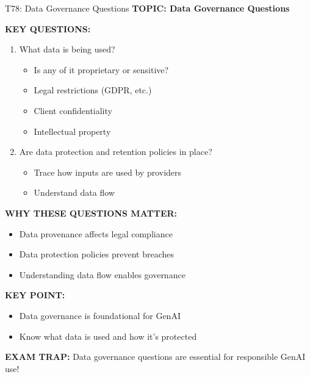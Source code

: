 \documentclass[8pt]{beamer}
\begin{document}
	\begin{frame}{T78: Data Governance Questions}
		\fontsize{6.5}{7.5}\selectfont
		\textbf{TOPIC: Data Governance Questions}
		
		\vspace{0.1cm}
		\textbf{KEY QUESTIONS:}
		\begin{enumerate}
			\item \textcolor{myblue}{What data is being used?}
			\begin{itemize}
				\item Is any of it proprietary or sensitive?
				\item Legal restrictions (GDPR, etc.)
				\item Client confidentiality
				\item Intellectual property
			\end{itemize}
			\item \textcolor{myblue}{Are data protection and retention policies in place?}
			\begin{itemize}
				\item Trace how inputs are used by providers
				\item Understand data flow
			\end{itemize}
		\end{enumerate}
		
		\vspace{0.1cm}
		\textbf{WHY THESE QUESTIONS MATTER:}
		\begin{itemize}
			\item Data provenance affects legal compliance
			\item Data protection policies prevent breaches
			\item Understanding data flow enables governance
		\end{itemize}
		
		\vspace{0.1cm}
		\textbf{KEY POINT:}
		\begin{itemize}
			\item Data governance is foundational for GenAI
			\item Know what data is used and how it's protected
		\end{itemize}
		
		\textcolor{myred}{\textbf{EXAM TRAP:}} Data governance questions are \textcolor{myblue}{essential for responsible GenAI use}!
	\end{frame}
	
\end{document}
